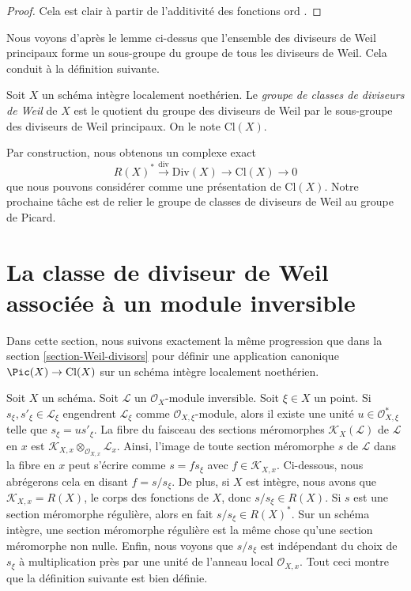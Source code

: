 \begin{proof}
Cela est clair à partir de l'additivité des fonctions  $\text{ord}$ .
\end{proof}

\noindent
Nous voyons d'après le lemme ci-dessus que l'ensemble des diviseurs de Weil
principaux forme un sous-groupe du groupe de tous les diviseurs de Weil. Cela
conduit à la définition suivante.

\begin{definition}
\label{definition-class-group}
Soit  $X$  un schéma intègre localement noethérien. Le
 {\it  groupe de classes de diviseurs de Weil }  de
 $X$  est le quotient du groupe des diviseurs de Weil par le sous-groupe
des diviseurs de Weil principaux. On le note  $\text{Cl}(X)$.
\end{definition}

\noindent
Par construction, nous obtenons un complexe exact
\begin{equation}
\label{equation-Weil-divisor-class}
R(X)^* \xrightarrow{\text{div}} \text{Div}(X) \to \text{Cl}(X) \to 0
\end{equation}
que nous pouvons considérer comme une présentation de  $\text{Cl}(X)$. Notre
prochaine tâche est de relier le groupe de classes de diviseurs de Weil au groupe
de Picard.





\section{La classe de diviseur de Weil associée à un module inversible}
\label{section-c1}

\noindent
Dans cette section, nous suivons exactement la même progression que dans la
section  \ref{section-Weil-divisors}  pour définir une application canonique  $\Pic(X) \to \text{Cl}(X)$  sur un
schéma intègre localement noethérien.

\medskip\noindent
Soit  $X$  un schéma. Soit  $\mathcal{L}$  un  $\mathcal{O}_X$-module inversible.
Soit  $\xi \in X$  un point. Si  $s_\xi, s'_\xi \in \mathcal{L}_\xi$  engendrent  $\mathcal{L}_\xi$  comme
 $\mathcal{O}_{X, \xi}$-module, alors il existe une unité  $u \in \mathcal{O}_{X, \xi}^*$  telle que
 $s_\xi = u s'_\xi$. La fibre du faisceau des sections méromorphes  $\mathcal{K}_X(\mathcal{L})$  de
 $\mathcal{L}$  en  $x$  est  $\mathcal{K}_{X, x} \otimes_{\mathcal{O}_{X, x}} \mathcal{L}_x$. Ainsi, l'image de toute
section méromorphe  $s$  de  $\mathcal{L}$  dans la fibre en  $x$  peut
s'écrire comme  $s = fs_\xi$  avec  $f \in \mathcal{K}_{X, x}$. Ci-dessous, nous abrégerons cela en
disant  $f = s/s_\xi$. De plus, si  $X$  est intègre, nous avons que
 $\mathcal{K}_{X, x} = R(X)$, le corps des fonctions de  $X$, donc  $s/s_\xi \in R(X)$.
Si  $s$  est une section méromorphe régulière, alors en fait  $s/s_\xi \in R(X)^*$.
Sur un schéma intègre, une section méromorphe régulière est la même chose qu'une
section méromorphe non nulle. Enfin, nous voyons que  $s/s_\xi$  est indépendant
du choix de  $s_\xi$  à multiplication près par une unité de
l'anneau local  $\mathcal{O}_{X, x}$. Tout ceci montre que la définition
suivante est bien définie.

